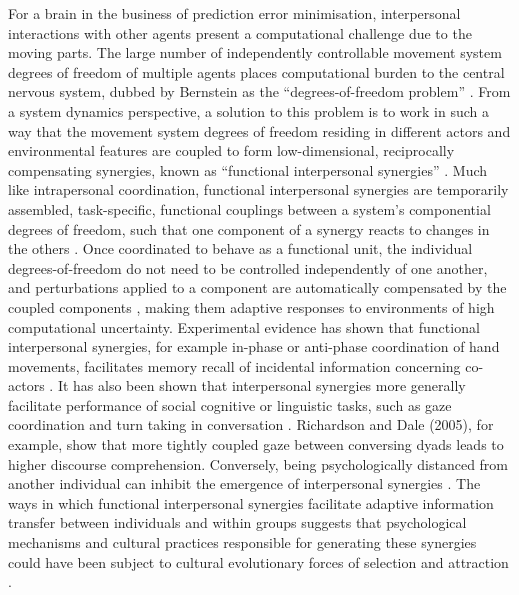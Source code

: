\begin{CJK}{UTF8}{gbsn}
For a brain in the business of prediction error minimisation, interpersonal interactions with other agents present a computational challenge due to the moving parts.  The large number of independently controllable movement system degrees of freedom of multiple agents places computational burden to the central nervous system, dubbed by Bernstein \textcite{Bernstein1967} as the ``degrees-of-freedom problem'' \citep[see also][]{Turvey1982,Turvey1990}.  From a system dynamics perspective, a solution to this problem is to work in such a way that the movement system degrees of freedom residing in different actors and environmental features are coupled to form low-dimensional, reciprocally compensating synergies, known as ``functional interpersonal synergies'' \citep{Riley2011}.
Much like intrapersonal coordination, functional interpersonal synergies are temporarily assembled, task-specific, functional couplings between a system's componential degrees of freedom, such that one component of a synergy reacts to changes in the others \citep{Kelso2009}.  Once coordinated to behave as a functional unit, the individual degrees-of-freedom do not need to be controlled independently of one another, and perturbations applied to a component are automatically compensated by the coupled components \citep{Kelso1984,Latash2002,Riley2011}, making them adaptive responses to environments of high computational uncertainty.
Experimental evidence has shown that functional interpersonal synergies, for example in-phase or anti-phase coordination of hand movements, facilitates memory recall of incidental information concerning co-actors \citep{Miles2010}. It has also been shown that interpersonal synergies more generally facilitate performance of social cognitive or linguistic tasks, such as gaze coordination and turn taking in conversation \citep{Richardson2005,Shockley2009}.  Richardson and Dale (2005), for example, show that more tightly coupled gaze between conversing dyads leads to higher discourse comprehension.  Conversely, being psychologically distanced from another individual can inhibit the emergence of interpersonal synergies \citep{Miles2010}.  The ways in which functional interpersonal synergies facilitate adaptive information transfer between individuals and within groups suggests that psychological mechanisms and cultural practices responsible for generating these synergies could have been subject to cultural evolutionary forces of selection and attraction \citep{Claidiere2014,Mesoudi2016a}.


\end{CJK}
